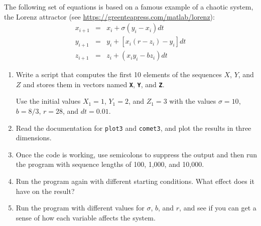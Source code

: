 \documentclass[../../book.tex]{subfiles}
\begin{document}
\begin{ex}
  The following set of equations is based on a famous example of a chaotic system, the Lorenz attractor (see \url{https://greenteapress.com/matlab/lorenz}):
%
\begin{eqnarray*}
x_{i+1} &=& x_i + \sigma \left( y_i - x_i \right) dt  \\
y_{i+1} &=& y_i + \left[ x_i (r - z_i) - y_i \right] dt   \\
z_{i+1} &=& z_i + \left( x_i y_i - b z_i \right) dt
\end{eqnarray*}
%
\begin{enumerate}

\item Write a script that computes the first 10 elements of the sequences
$X$, $Y$, and $Z$ and stores them in vectors named \textbf{\lstinline{X}}, \textbf{\lstinline{Y}},
and \textbf{\lstinline{Z}}.

Use the initial values $X_1 = 1$, $Y_1 = 2$, and $Z_1 = 3$ with the values
$\sigma = 10$, $b = 8/3$, $r = 28$, and $dt = 0.01$.

\item Read the documentation for \lstinline{plot3} and \lstinline{comet3}, and
plot the results in three dimensions.

\item Once the code is working, use semicolons to suppress the output
and then run the program with sequence lengths of 100, 1,000, and 10,000.

\item Run the program again with different starting conditions.
What effect does it have on the result?

\item Run the program with different values for $\sigma$, $b$, and $r$,
and see if you can get a sense of how each variable affects the
system.

\end{enumerate}


\end{ex}
\end{document}
